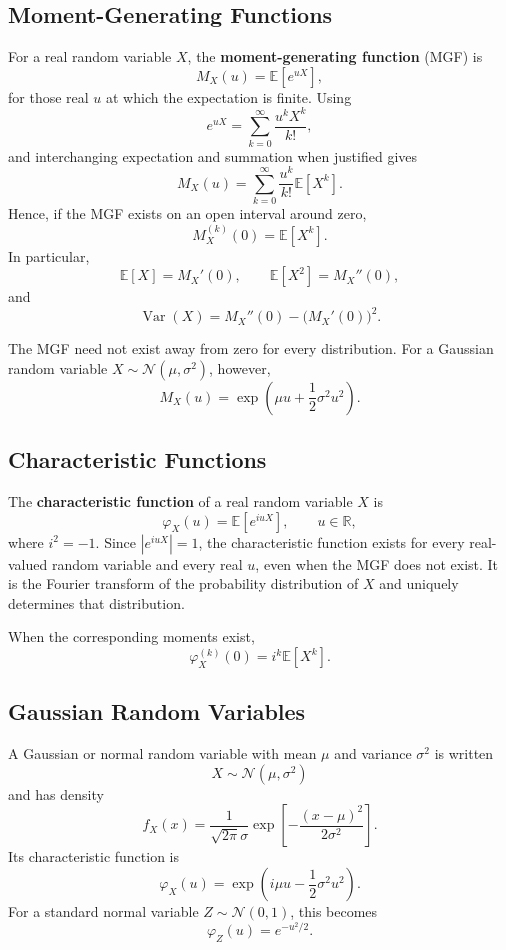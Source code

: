 \documentclass[12pt,openany]{book}
\theoremstyle{definition}
\theoremstyle{remark}
\begin{document}
\subsection{Moment-Generating Functions}

For a real random variable \(X\), the \textbf{moment-generating function}
(MGF) is
\[
M_X(u)=\mathbb{E}\!\left[e^{uX}\right],
\]
for those real \(u\) at which the expectation is finite. Using
\[
e^{uX}=\sum_{k=0}^{\infty}\frac{u^kX^k}{k!},
\]
and interchanging expectation and summation when justified gives
\[
M_X(u)
=\sum_{k=0}^{\infty}\frac{u^k}{k!}\mathbb{E}[X^k].
\]
Hence, if the MGF exists on an open interval around zero,
\[
M_X^{(k)}(0)=\mathbb{E}[X^k].
\]
In particular,
\[
\mathbb{E}[X]=M_X'(0),
\qquad
\mathbb{E}[X^2]=M_X''(0),
\]
and
\[
\operatorname{Var}(X)
=M_X''(0)-\bigl(M_X'(0)\bigr)^2.
\]

The MGF need not exist away from zero for every distribution. For a Gaussian
random variable \(X\sim\mathcal{N}(\mu,\sigma^2)\), however,
\[
M_X(u)=\exp\!\left(\mu u+\frac{1}{2}\sigma^2u^2\right).
\]

\subsection{Characteristic Functions}

The \textbf{characteristic function} of a real random variable \(X\) is
\[
\varphi_X(u)
=\mathbb{E}\!\left[e^{iuX}\right],
\qquad u\in\mathbb{R},
\]
where \(i^2=-1\). Since \(|e^{iuX}|=1\), the characteristic function exists
for every real-valued random variable and every real \(u\), even when the MGF
does not exist. It is the Fourier transform of the probability distribution
of \(X\) and uniquely determines that distribution.

When the corresponding moments exist,
\[
\varphi_X^{(k)}(0)=i^k\mathbb{E}[X^k].
\]

\subsection{Gaussian Random Variables}

A Gaussian or normal random variable with mean \(\mu\) and variance
\(\sigma^2\) is written
\[
X\sim\mathcal{N}(\mu,\sigma^2)
\]
and has density
\[
f_X(x)
=\frac{1}{\sqrt{2\pi}\sigma}
\exp\!\left[-\frac{(x-\mu)^2}{2\sigma^2}\right].
\]
Its characteristic function is
\[
\boxed{
\varphi_X(u)
=\exp\!\left(i\mu u-\frac{1}{2}\sigma^2u^2\right)
}.
\]
For a standard normal variable \(Z\sim\mathcal{N}(0,1)\), this becomes
\[
\varphi_Z(u)=e^{-u^2/2}.
\]
\end{document}
